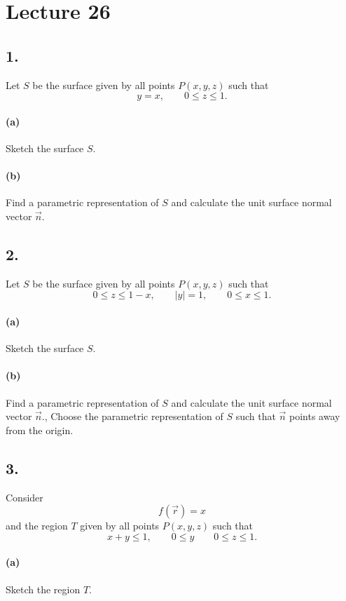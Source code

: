 \section*{Lecture 26}

\subsection*{1.} Let $S$ be the surface given by all points $P(x,y,z)$ such that
\[ 
y = x, \qquad 0 \leq z \leq 1
.\]

\paragraph{(a)} Sketch the surface $S$.

\paragraph{(b)} Find a parametric representation of $S$ and calculate the unit surface normal vector $\Vec{n}$.


\subsection*{2.} Let $S$ be the surface given by all points $P(x,y,z)$ such that
\[ 
0 \leq z \leq 1 - x, \qquad \left| y \right|=1, \qquad 0 \leq x \leq 1
.\]

\paragraph{(a)} Sketch the surface $S$.

\paragraph{(b)} Find a parametric representation of $S$ and calculate the unit surface normal vector $\Vec{n}$., Choose the parametric representation of $S$ such that $\Vec{n}$ points away from the origin.


\subsection*{3.} Consider
\[ 
f \left( \Vec{r} \right) = x
\]
and the region $T$ given by all points $P(x,y,z)$ such that
\[ 
x+y \leq 1, \qquad 0 \leq y \qquad 0 \leq z \leq 1
.\]

\paragraph{(a)} Sketch the region $T$.

